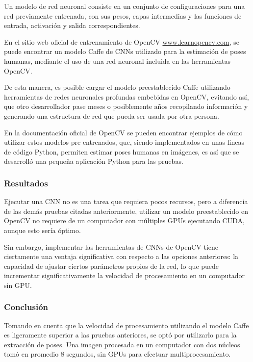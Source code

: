 \documentclass[a4paper,12pt,oneside,spanish]{book}
\begin{document}
Un modelo de red neuronal consiste en un conjunto de configuraciones para una red previamente entrenada, con sus pesos, capas intermedias y las funciones de entrada, activación y salida correspondientes.\par 

En el sitio web oficial de entrenamiento de OpenCV \url{www.learnopencv.com}, se puede encontrar un modelo Caffe de CNNs utilizado para la estimación de poses humanas, mediante el uso de una red neuronal incluida en las herramientas OpenCV.\par

De esta manera, es posible cargar el modelo preestablecido Caffe utilizando herramientas de redes neuronales profundas embebidas en OpenCV, evitando así, que otro desarrollador pase meses o posiblemente años recopilando información y generando una estructura de red que pueda ser usada por otra persona.\par

En la documentación oficial de OpenCV se pueden encontrar ejemplos de cómo utilizar estos modelos pre entrenados, que, siendo implementados en unas lineas de código Python, permiten estimar poses humanas en imágenes, es así que se desarrolló una pequeña aplicación Python para las pruebas. 

\subsubsection{Resultados}
Ejecutar una CNN no es una tarea que requiera pocos recursos, pero a diferencia de las demás pruebas citadas anteriormente, utilizar un modelo preestablecido en OpenCV no requiere de un computador con múltiples GPUs ejecutando CUDA, aunque esto sería óptimo.\par

Sin embargo, implementar las herramientas de CNNs de OpenCV tiene ciertamente una ventaja significativa con respecto a las opciones anteriores: la capacidad de ajustar ciertos parámetros propios de la red, lo que puede incrementar significativamente la velocidad de procesamiento en un computador sin GPU.\par

\subsubsection{Conclusión}
Tomando en cuenta que la velocidad de procesamiento utilizando el modelo Caffe es ligeramente superior a las pruebas anteriores, se optó por utilizarlo para la extracción de poses. Una imagen procesada en un computador con dos núcleos tomó en promedio 8 segundos, sin GPUs para efectuar multiprocesamiento.\par
\end{document}
